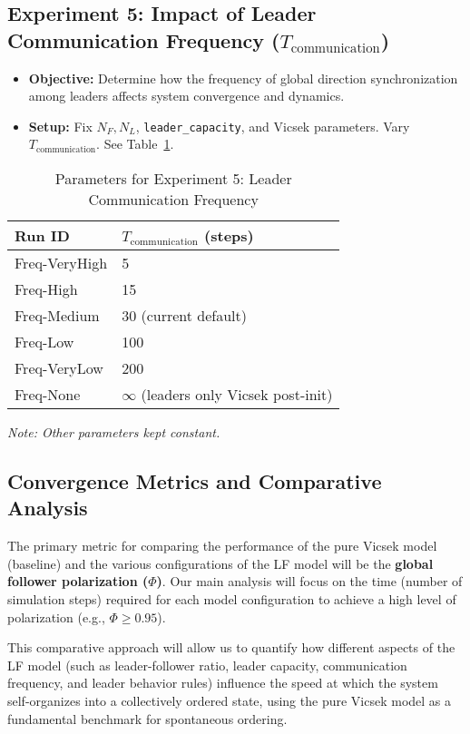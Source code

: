 \documentclass[11pt]{article}
\begin{document}
\subsection{Experiment 5: Impact of Leader Communication Frequency ($T_{\text{communication}}$)}
\begin{itemize}
    \item \textbf{Objective:} Determine how the frequency of global direction synchronization among leaders affects system convergence and dynamics.
    \item \textbf{Setup:} Fix $N_F, N_L$, \texttt{leader\_capacity}, and Vicsek parameters. Vary $T_{\text{communication}}$. See Table~\ref{tab:exp5_params}.
\end{itemize}
\begin{table}[H]
    \centering
    \caption{Parameters for Experiment 5: Leader Communication Frequency}
    \label{tab:exp5_params}
    \begin{tabular}{ll}
        \toprule
        Run ID & $T_{\text{communication}}$ (steps) \\
        \midrule
        Freq-VeryHigh & 5 \\
        Freq-High     & 15 \\
        Freq-Medium   & 30 (current default) \\
        Freq-Low      & 100 \\
        Freq-VeryLow  & 200 \\
        Freq-None     & $\infty$ (leaders only Vicsek post-init) \\
        \bottomrule
    \end{tabular}
    \parbox{\textwidth}{\footnotesize \textit{Note: Other parameters kept constant.}}
\end{table}

\subsection{Convergence Metrics and Comparative Analysis}
The primary metric for comparing the performance of the pure Vicsek model (baseline) and the various configurations of the LF model will be the \textbf{global follower polarization ($\Phi$)}. Our main analysis will focus on the time (number of simulation steps) required for each model configuration to achieve a high level of polarization (e.g., $\Phi \ge 0.95$). 

This comparative approach will allow us to quantify how different aspects of the LF model (such as leader-follower ratio, leader capacity, communication frequency, and leader behavior rules) influence the speed at which the system self-organizes into a collectively ordered state, using the pure Vicsek model as a fundamental benchmark for spontaneous ordering.
\end{document}
